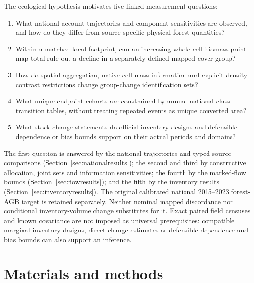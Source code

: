 \documentclass[11pt,a4paper]{article}
\begin{document}
The ecological hypothesis motivates five linked measurement questions:
\begin{enumerate}
\item What national account trajectories and component sensitivities are observed, and how do they differ from source-specific physical forest quantities?
\item Within a matched local footprint, can an increasing whole-cell biomass point-map total rule out a decline in a separately defined mapped-cover group?
\item How do spatial aggregation, native-cell mass information and explicit density-contrast restrictions change group-change identification sets?
\item What unique endpoint cohorts are constrained by annual national class-transition tables, without treating repeated events as unique converted area?
\item What stock-change statements do official inventory designs and defensible dependence or bias bounds support on their actual periods and domains?
\end{enumerate}
The first question is answered by the national trajectories and typed source comparisons (Section~\ref{sec:nationalresults}); the second and third by constructive allocation, joint sets and information sensitivities; the fourth by the marked-flow bounds (Section~\ref{sec:flowresults}); and the fifth by the inventory results (Section~\ref{sec:inventoryresults}). The original calibrated national 2015--2023 forest-AGB target is retained separately. Neither nominal mapped discordance nor conditional inventory-volume change substitutes for it. Exact paired field censuses and known covariance are not imposed as universal prerequisites: compatible marginal inventory designs, direct change estimates or defensible dependence and bias bounds can also support an inference.

\section{Materials and methods}
\end{document}
